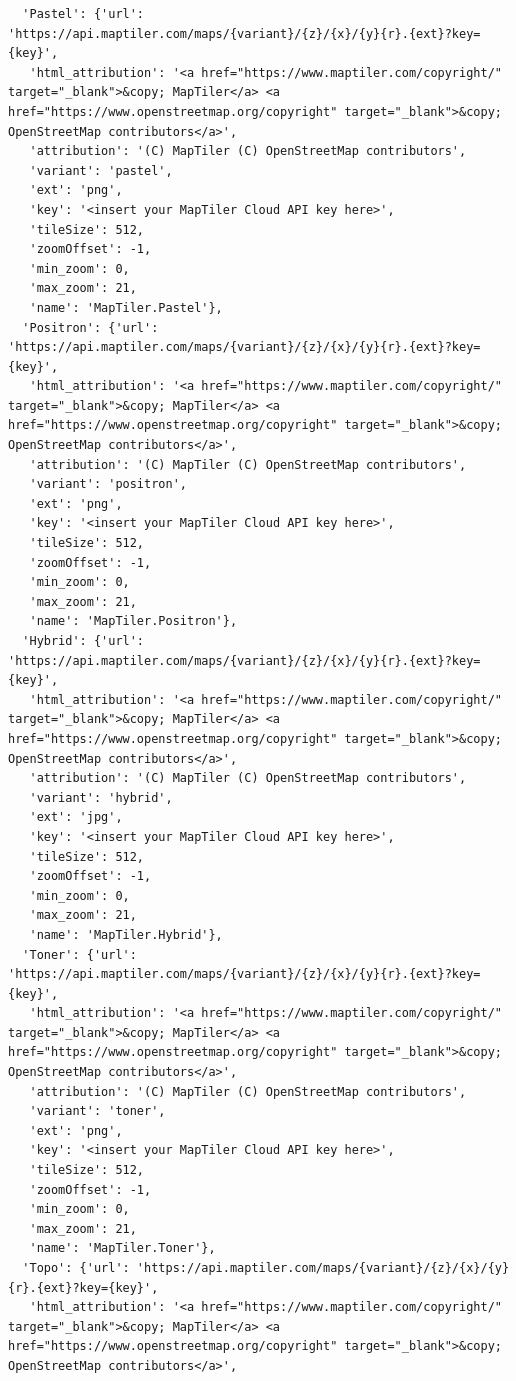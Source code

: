 \documentclass[
  letterpaper,
  DIV=11,
  numbers=noendperiod]{scrreprt}
\begin{document}
\begin{verbatim}
  'Pastel': {'url': 'https://api.maptiler.com/maps/{variant}/{z}/{x}/{y}{r}.{ext}?key={key}',
   'html_attribution': '<a href="https://www.maptiler.com/copyright/" target="_blank">&copy; MapTiler</a> <a href="https://www.openstreetmap.org/copyright" target="_blank">&copy; OpenStreetMap contributors</a>',
   'attribution': '(C) MapTiler (C) OpenStreetMap contributors',
   'variant': 'pastel',
   'ext': 'png',
   'key': '<insert your MapTiler Cloud API key here>',
   'tileSize': 512,
   'zoomOffset': -1,
   'min_zoom': 0,
   'max_zoom': 21,
   'name': 'MapTiler.Pastel'},
  'Positron': {'url': 'https://api.maptiler.com/maps/{variant}/{z}/{x}/{y}{r}.{ext}?key={key}',
   'html_attribution': '<a href="https://www.maptiler.com/copyright/" target="_blank">&copy; MapTiler</a> <a href="https://www.openstreetmap.org/copyright" target="_blank">&copy; OpenStreetMap contributors</a>',
   'attribution': '(C) MapTiler (C) OpenStreetMap contributors',
   'variant': 'positron',
   'ext': 'png',
   'key': '<insert your MapTiler Cloud API key here>',
   'tileSize': 512,
   'zoomOffset': -1,
   'min_zoom': 0,
   'max_zoom': 21,
   'name': 'MapTiler.Positron'},
  'Hybrid': {'url': 'https://api.maptiler.com/maps/{variant}/{z}/{x}/{y}{r}.{ext}?key={key}',
   'html_attribution': '<a href="https://www.maptiler.com/copyright/" target="_blank">&copy; MapTiler</a> <a href="https://www.openstreetmap.org/copyright" target="_blank">&copy; OpenStreetMap contributors</a>',
   'attribution': '(C) MapTiler (C) OpenStreetMap contributors',
   'variant': 'hybrid',
   'ext': 'jpg',
   'key': '<insert your MapTiler Cloud API key here>',
   'tileSize': 512,
   'zoomOffset': -1,
   'min_zoom': 0,
   'max_zoom': 21,
   'name': 'MapTiler.Hybrid'},
  'Toner': {'url': 'https://api.maptiler.com/maps/{variant}/{z}/{x}/{y}{r}.{ext}?key={key}',
   'html_attribution': '<a href="https://www.maptiler.com/copyright/" target="_blank">&copy; MapTiler</a> <a href="https://www.openstreetmap.org/copyright" target="_blank">&copy; OpenStreetMap contributors</a>',
   'attribution': '(C) MapTiler (C) OpenStreetMap contributors',
   'variant': 'toner',
   'ext': 'png',
   'key': '<insert your MapTiler Cloud API key here>',
   'tileSize': 512,
   'zoomOffset': -1,
   'min_zoom': 0,
   'max_zoom': 21,
   'name': 'MapTiler.Toner'},
  'Topo': {'url': 'https://api.maptiler.com/maps/{variant}/{z}/{x}/{y}{r}.{ext}?key={key}',
   'html_attribution': '<a href="https://www.maptiler.com/copyright/" target="_blank">&copy; MapTiler</a> <a href="https://www.openstreetmap.org/copyright" target="_blank">&copy; OpenStreetMap contributors</a>',

\end{verbatim}
\end{document}
